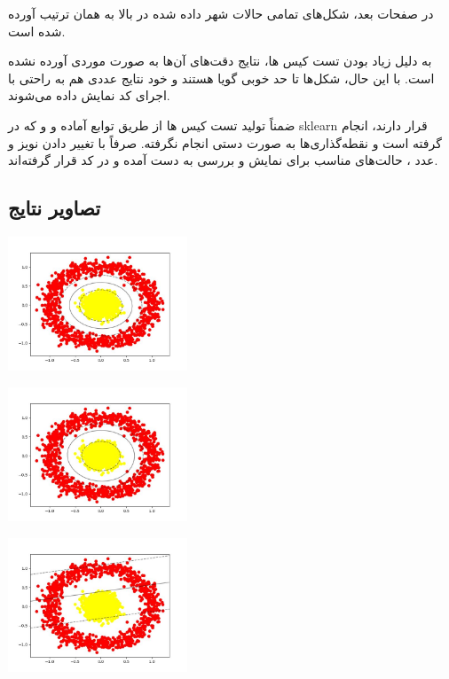 \documentclass[12pt,titlepage,a4page , tikz , multi,table , svgnames,xcdraw]{article}
\begin{document}
در صفحات بعد، شکل‌های تمامی حالات شهر داده شده در بالا به همان ترتیب آورده شده است.


به دلیل زیاد بودن تست کیس ها، نتایج دقت‌های آن‌ها به صورت موردی آورده نشده است. با این حال، شکل‌ها تا حد خوبی گویا هستند و خود نتایج عددی هم به راحتی با اجرای کد نمایش داده می‌شوند.


ضمناً تولید تست کیس ها از طریق توابع آماده  و  و  که در sklearn قرار دارند، انجام گرفته است و نقطه‌گذاری‌ها به صورت دستی انجام نگرفته. صرفاً با تغییر دادن نویز و عدد ، حالت‌های مناسب برای نمایش و بررسی به دست آمده و در کد قرار گرفته‌اند.



\subsection{تصاویر نتایج}

\begin{center}

 \includegraphics[width=0.4\textwidth]{images/0.jpg}

\end{center}


\begin{center}

 \includegraphics[width=0.4\textwidth]{images/1.jpg}

\end{center}


\begin{center}

 \includegraphics[width=0.4\textwidth]{images/2.jpg}

\end{center}
\end{document}
